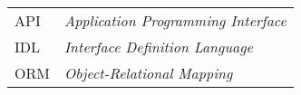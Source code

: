 \begin{longtable}{ll}
  API & \textit{Application Programming Interface} \\
  IDL & \textit{Interface Definition Language} \\
  ORM & \textit{Object-Relational Mapping} \\
\end{longtable}

